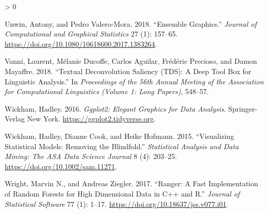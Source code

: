 \documentclass[
]{article}
\newlength{\cslhangindent}
\newenvironment{CSLReferences}[2] %
 {%
  \setlength{\parindent}{0pt}
  \ifodd #1 \everypar{\setlength{\hangindent}{\cslhangindent}}\ignorespaces\fi
  \ifnum #2 > 0
  \setlength{\parskip}{#2\baselineskip}
  \fi
 }%
 {}
\begin{document}
\begin{CSLReferences}{1}{0}
\leavevmode\hypertarget{ref-unwin_ensemble_2018}{}%
Unwin, Antony, and Pedro Valero-Mora. 2018. {``Ensemble {Graphics}.''} \emph{Journal of Computational and Graphical Statistics} 27 (1): 157--65. \url{https://doi.org/10.1080/10618600.2017.1383264}.

\leavevmode\hypertarget{ref-vanni_textual_2018}{}%
Vanni, Laurent, Mélanie Ducoffe, Carlos Aguilar, Frédéric Precioso, and Damon Mayaffre. 2018. {``Textual {Deconvolution} {Saliency} ({TDS}): A Deep Tool Box for Linguistic Analysis.''} In \emph{Proceedings of the 56th {Annual} {Meeting} of the {Association} for {Computational} {Linguistics} ({Volume} 1: {Long} {Papers})}, 548--57.

\leavevmode\hypertarget{ref-wickham_ggplot2_2016}{}%
Wickham, Hadley. 2016. \emph{Ggplot2: {Elegant} {Graphics} for {Data} {Analysis}}. Springer-Verlag New York. \url{https://ggplot2.tidyverse.org}.

\leavevmode\hypertarget{ref-wickham_visualizing_2015}{}%
Wickham, Hadley, Dianne Cook, and Heike Hofmann. 2015. {``Visualizing Statistical Models: {Removing} the Blindfold.''} \emph{Statistical Analysis and Data Mining: The ASA Data Science Journal} 8 (4): 203--25. \url{https://doi.org/10.1002/sam.11271}.

\leavevmode\hypertarget{ref-wright_ranger_2017}{}%
Wright, Marvin N., and Andreas Ziegler. 2017. {``Ranger: {A} {Fast} {Implementation} of {Random} {Forests} for {High} {Dimensional} {Data} in {C}++ and {R}.''} \emph{Journal of Statistical Software} 77 (1): 1--17. \url{https://doi.org/10.18637/jss.v077.i01}.

\end{CSLReferences}
\end{document}
